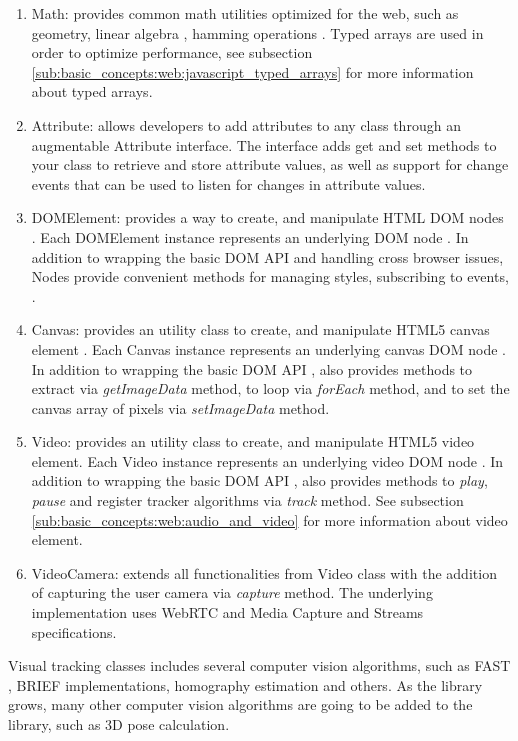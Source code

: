 \begin{enumerate}
  \item Math: provides common math utilities optimized for the web, such as geometry, linear algebra \cite{Hartley2004}, hamming operations \etc. Typed arrays \cite{TypedArray2013} are used in order to optimize performance, see subsection \ref{sub:basic_concepts:web:javascript_typed_arrays} for more information about typed arrays.
  \item Attribute: allows developers to add attributes to any class through an augmentable Attribute interface. The interface adds get and set methods to your class to retrieve and store attribute values, as well as support for change events that can be used to listen for changes in attribute values.
  \item DOMElement: provides a way to create, and manipulate HTML \cite{Hickson2013} DOM nodes \cite{WC2006}. Each DOMElement instance represents an underlying DOM node \cite{WC2006}. In addition to wrapping the basic DOM API \cite{WC2006} and handling cross browser issues, Nodes provide convenient methods for managing styles, subscribing to events, \etc.
  \item Canvas: provides an utility class to create, and manipulate HTML5 \cite{Hickson2013} canvas element \cite{Canvas2013}. Each Canvas instance represents an underlying canvas DOM node \cite{Canvas2013}. In addition to wrapping the basic DOM API \cite{WC2006}, also provides methods to extract via \textit{getImageData} method, to loop via \textit{forEach} method, and to set the canvas array of pixels via \textit{setImageData} method.
  \item Video: provides an utility class to create, and manipulate HTML5 \cite{Hickson2013} video element. Each Video instance represents an underlying video DOM node \cite{Canvas2013}. In addition to wrapping the basic DOM API \cite{WC2006}, also provides methods to \textit{play}, \textit{pause} and register tracker algorithms via \textit{track} method. See subsection \ref{sub:basic_concepts:web:audio_and_video} for more information about video element.
  \item VideoCamera: extends all functionalities from Video class with the addition of capturing the user camera via \textit{capture} method. The underlying implementation uses WebRTC \cite{WebRTC2013} and Media Capture and Streams \cite{MediaCapture2013} specifications.
\end{enumerate}

Visual tracking classes includes several computer vision algorithms, such as FAST \cite{RostenFaster2010}, BRIEF \cite{Calonder2010} implementations, homography estimation and others. As the library grows, many other computer vision algorithms are going to be added to the library, such as 3D pose calculation.

